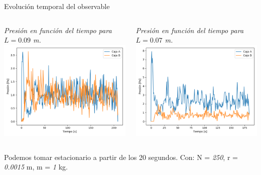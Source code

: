 \documentclass{beamer}
\begin{document}
\begin{frame}{Evolución temporal del observable}
  \begin{columns}
    \begin{column}{0.5\textwidth}
      \tiny \textit{Presión en función del tiempo para $L = 0.09$ m.}
      \includegraphics[width=\linewidth]{photoMaterial/pvt_09.png}
    \end{column}
    \begin{column}{0.5\textwidth}
      \tiny \textit{Presión en función del tiempo para $L = 0.07$ m.}
      \includegraphics[width=\linewidth]{photoMaterial/pvt_07.png}
    \end{column}
    \end{columns}
    \tiny Podemos tomar estacionario a partir de los 20 segundos.
    \tiny Con: N = \textit{250}, r = \textit{0.0015} m, m = \textit{1} kg.
\end{frame}
\end{document}
